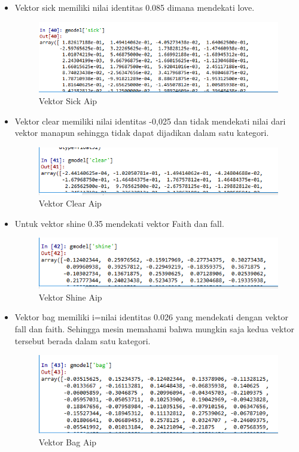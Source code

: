 \begin{itemize}
\item  Vektor sick memiliki nilai identitas 0.085 dimana mendekati love.
\begin{figure}[!hbtp]
\centering
\includegraphics[scale=0.5]{figures/AIP/e7.PNG}
\caption{Vektor Sick Aip}
\label{Praktek}
\end{figure}


\item Vektor clear memiliki nilai identitas -0,025 dan tidak mendekati nilai dari vektor manapun sehingga tidak dapat dijadikan dalam satu kategori.
\begin{figure}[!hbtp]
\centering
\includegraphics[scale=0.3]{figures/AIP/e8.PNG}
\caption{Vektor Clear Aip}
\label{Praktek}
\end{figure}

\item Untuk vektor shine 0.35 mendekati vektor Faith dan fall.
\begin{figure}[!hbtp]
\centering
\includegraphics[scale=0.3]{figures/AIP/e9.PNG}
\caption{Vektor Shine Aip}
\label{Praktek}
\end{figure}


\item Vektor bag memiliki i=nilai identitas 0.026 yang mendekati dengan vektor fall dan faith. Sehingga mesin memahami bahwa mungkin saja kedua vektor tersebut berada dalam satu kategori.
\begin{figure}[!hbtp]
\centering
\includegraphics[scale=0.3]{figures/AIP/e10.PNG}
\caption{Vektor Bag Aip}
\label{Praktek}
\end{figure}



\end{itemize}
